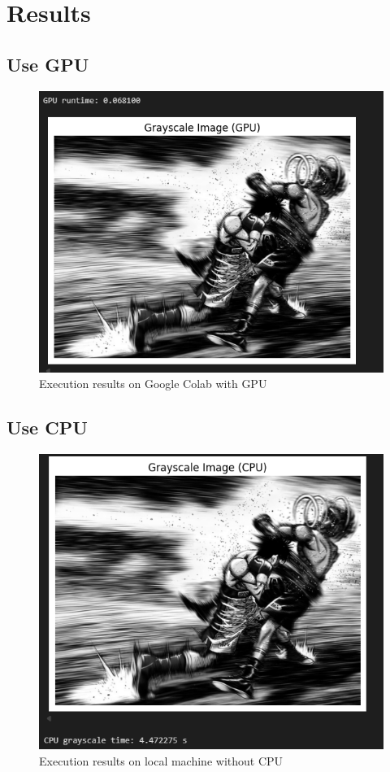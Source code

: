 \documentclass[12pt]{article}
\begin{document}
\section{Results}
\subsection{Use GPU}
\begin{figure}[H]
    \centering
    \includegraphics[width=0.75\linewidth]{images/gpu_output.png}
    \caption{Execution results on Google Colab with GPU}
    \label{fig:gpu}
\end{figure}

\subsection{Use CPU}
\begin{figure}[H]
    \centering
    \includegraphics[width=0.75\linewidth]{images/cpu_output.png}
    \caption{Execution results on local machine without CPU}
    \label{fig:nogpu}
\end{figure}
\end{document}
